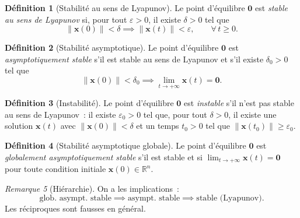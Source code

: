\documentclass[12pt,a4paper,openany]{book}
\theoremstyle{definition}
\newtheorem{definition}{Définition}[chapter]
\theoremstyle{plain}
\theoremstyle{remark}
\newtheorem{remarque}[definition]{Remarque}
\newcommand{\R}{\mathbb{R}}
\newcommand{\norm}[1]{\left\|#1\right\|}
\begin{document}
\begin{definition}[Stabilité au sens de Lyapunov]\label{def:stab-lyapunov}
  Le point d'équilibre $\mathbf{0}$ est \emph{stable au sens de
  Lyapunov} si, pour tout $\varepsilon>0$, il existe $\delta>0$ tel que
  \[
    \norm{\mathbf{x}(0)}<\delta
    \implies
    \norm{\mathbf{x}(t)}<\varepsilon,
    \qquad\forall\,t\geq 0.
  \]
\end{definition}

\begin{definition}[Stabilité asymptotique]\label{def:stab-asymptotique}
  Le point d'équilibre $\mathbf{0}$ est \emph{asymptotiquement stable}
  s'il est stable au sens de Lyapunov et s'il existe $\delta_0>0$ tel
  que
  \[
    \norm{\mathbf{x}(0)}<\delta_0
    \implies
    \lim_{t\to+\infty}\mathbf{x}(t)=\mathbf{0}.
  \]
\end{definition}

\begin{definition}[Instabilité]\label{def:instabilite}
  Le point d'équilibre $\mathbf{0}$ est \emph{instable} s'il n'est
  pas stable au sens de Lyapunov~: il existe $\varepsilon_0>0$ tel que,
  pour tout $\delta>0$, il existe une solution $\mathbf{x}(t)$ avec
  $\norm{\mathbf{x}(0)}<\delta$ et un temps $t_0>0$ tel que
  $\norm{\mathbf{x}(t_0)}\geq\varepsilon_0$.
\end{definition}

\begin{definition}[Stabilité asymptotique globale]\label{def:stab-globale}
  Le point d'équilibre $\mathbf{0}$ est \emph{globalement
  asymptotiquement stable} s'il est stable et si
  $\lim_{t\to+\infty}\mathbf{x}(t)=\mathbf{0}$ pour toute condition
  initiale $\mathbf{x}(0)\in\R^n$.
\end{definition}

\begin{remarque}[Hiérarchie]\label{rem:hierarchie-stab}
  On a les implications~:
  \[
    \text{glob. asympt. stable}
    \implies
    \text{asympt. stable}
    \implies
    \text{stable (Lyapunov)}.
  \]
  Les réciproques sont fausses en général.
\end{remarque}
\end{document}
